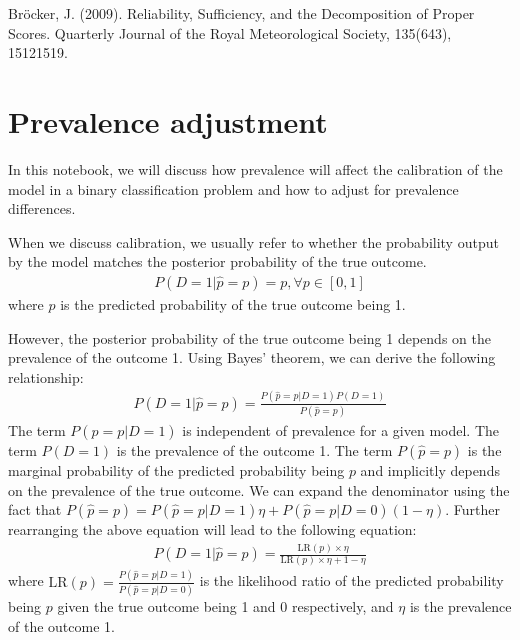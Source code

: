 \documentclass[letterpaper,10pt,english]{sphinxmanual}
\begin{document}
\sphinxAtStartPar
Bröcker, J. (2009). Reliability, Sufficiency, and the Decomposition of Proper Scores. Quarterly Journal of the Royal Meteorological Society, 135(643), 1512\textendash{}1519. 

\sphinxstepscope


\chapter{Prevalence adjustment}
\label{\detokenize{notebooks/prevalence_adjustment:Prevalence-adjustment}}\label{\detokenize{notebooks/prevalence_adjustment::doc}}
\sphinxAtStartPar
In this notebook, we will discuss how prevalence will affect the calibration of the model in a binary classification problem and how to adjust for prevalence differences.

\sphinxAtStartPar
When we discuss calibration, we usually refer to whether the probability output by the model matches the posterior probability of the true outcome.
\begin{equation*}
\begin{split}P(D=1|\hat{p} = p) = p ,\forall p \in [0,1]\end{split}
\end{equation*}
\sphinxAtStartPar
where \(\hat{p}\) is the predicted probability of the true outcome being 1.

\sphinxAtStartPar
However, the posterior probability of the true outcome being 1 depends on the prevalence of the outcome 1. Using Bayes’ theorem, we can derive the following relationship:
\begin{equation*}
\begin{split}P(D=1|\hat{p} = p) = \frac{P(\hat{p} = p|D=1)P(D=1)}{P(\hat{p} = p)}\end{split}
\end{equation*}
\sphinxAtStartPar
The term \(P(\hat{p} = p|D=1)\) is independent of prevalence for a given model. The term \(P(D=1)\) is the prevalence of the outcome 1. The term \(P(\hat{p} = p)\) is the marginal probability of the predicted probability being \(p\) and implicitly depends on the prevalence of the true outcome. We can expand the denominator using the fact that \(P(\hat{p} = p) = P(\hat{p} = p|D=1)\eta + P(\hat{p} = p|D=0)(1-\eta)\). Further rearranging the above equation will lead to the
following equation:
\begin{equation*}
\begin{split}P(D=1|\hat{p}=p) = \frac{\text{LR}(p) \times \eta}{\text{LR}(p) \times \eta + 1 - \eta}\end{split}
\end{equation*}
\sphinxAtStartPar
where \(\text{LR}(p) = \frac{P(\hat{p} = p|D=1)}{P(\hat{p} = p|D=0)}\) is the likelihood ratio of the predicted probability being \(p\) given the true outcome being 1 and 0 respectively, and \(\eta\) is the prevalence of the outcome 1.
\end{document}
